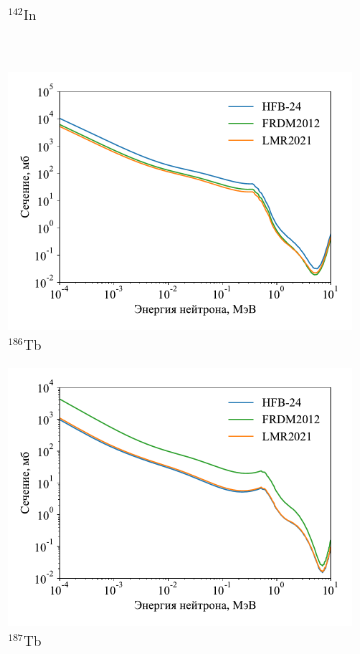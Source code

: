 \begin{figure}
\begin{subfigure}{0.48\textwidth}
    \caption{${}^{142}$In}
  \end{subfigure}
  \\
  \begin{subfigure}{0.48\textwidth}
    \centering
    \includegraphics[width=\textwidth]{../pics/cs_tb186.pdf}
    \caption{${}^{186}$Tb}
  \end{subfigure}
  \hfil
  \begin{subfigure}{0.48\textwidth}
    \centering
    \includegraphics[width=\textwidth]{../pics/cs_tb187.pdf}
    \caption{${}^{187}$Tb}
  \end{subfigure}
  \\
  \begin{subfigure}{0.48\textwidth}
    \centering

\end{subfigure}
\end{figure}
